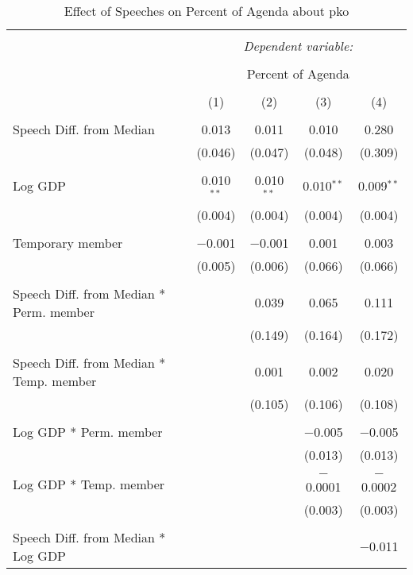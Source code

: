 
\begin{table}[!htbp] \centering 
  \caption{Effect of Speeches on Percent of Agenda about  pko} 
  \label{} 
\begin{tabular}{@{\extracolsep{5pt}}lcccc} 
\\[-1.8ex]\hline 
\hline \\[-1.8ex] 
 & \multicolumn{4}{c}{\textit{Dependent variable:}} \\ 
\cline{2-5} 
\\[-1.8ex] & \multicolumn{4}{c}{Percent of Agenda} \\ 
\\[-1.8ex] & (1) & (2) & (3) & (4)\\ 
\hline \\[-1.8ex] 
 Speech Diff. from Median & 0.013 & 0.011 & 0.010 & 0.280 \\ 
  & (0.046) & (0.047) & (0.048) & (0.309) \\ 
  & & & & \\ 
 Log GDP & 0.010$^{**}$ & 0.010$^{**}$ & 0.010$^{**}$ & 0.009$^{**}$ \\ 
  & (0.004) & (0.004) & (0.004) & (0.004) \\ 
  & & & & \\ 
 Temporary member & $-$0.001 & $-$0.001 & 0.001 & 0.003 \\ 
  & (0.005) & (0.006) & (0.066) & (0.066) \\ 
  & & & & \\ 
 Speech Diff. from Median * Perm. member &  & 0.039 & 0.065 & 0.111 \\ 
  &  & (0.149) & (0.164) & (0.172) \\ 
  & & & & \\ 
 Speech Diff. from Median * Temp. member &  & 0.001 & 0.002 & 0.020 \\ 
  &  & (0.105) & (0.106) & (0.108) \\ 
  & & & & \\ 
 Log GDP * Perm. member &  &  & $-$0.005 & $-$0.005 \\ 
  &  &  & (0.013) & (0.013) \\ 
  & & & & \\ 
 Log GDP * Temp. member &  &  & $-$0.0001 & $-$0.0002 \\ 
  &  &  & (0.003) & (0.003) \\ 
  & & & & \\ 
 Speech Diff. from Median * Log GDP &  &  &  & $-$0.011 \\ 

\end{tabular}
\end{table}
